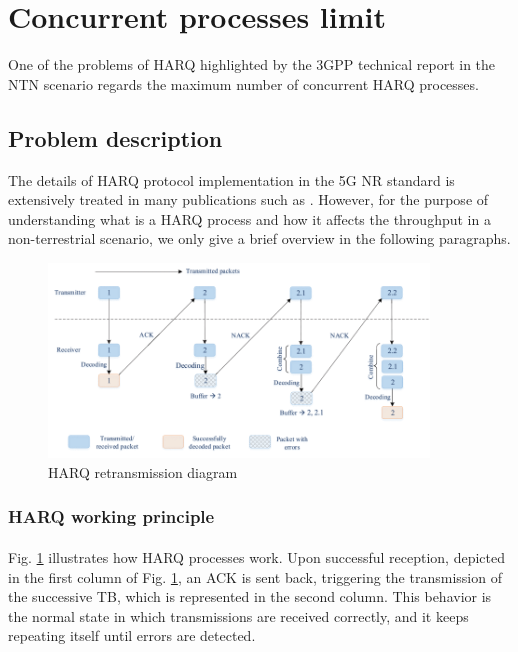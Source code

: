 \section{Concurrent processes limit}
\label{sec:harq-conc-proc}

One of the problems of \ac{HARQ} highlighted by the \ac{3GPP} technical report \cite{3gpp-tr-38.811} in the \ac{NTN} scenario regards the maximum number of concurrent \ac{HARQ} processes. 

\subsection{Problem description}
The details of \ac{HARQ} protocol implementation in the 5G \ac{NR} standard is extensively treated in many publications such as \cite{harq-wireless-communications-survey}. However, for the purpose of understanding what is a \ac{HARQ} process and how it affects the throughput in a non-terrestrial scenario, we only give a brief overview in the following paragraphs.

\begin{figure}[ht]
    \centering
    \includegraphics[width=0.9\textwidth]{res/harq-retx-scheme.png}
    \caption{\ac{HARQ} retransmission diagram \cite{harq-wireless-communications-survey}}
    \label{fig:harq_retx_scheme}
\end{figure}

\subsubsection{HARQ working principle}
\paragraph{}
Fig. \ref{fig:harq_retx_scheme} illustrates how \ac{HARQ} processes work. Upon successful reception, depicted in the first column of Fig. \ref{fig:harq_retx_scheme}, an \ac{ACK} is sent back, triggering the transmission of the successive \ac{TB}, which is represented in the second column. This behavior is the normal state in which transmissions are received correctly, and it keeps repeating itself until errors are detected.

